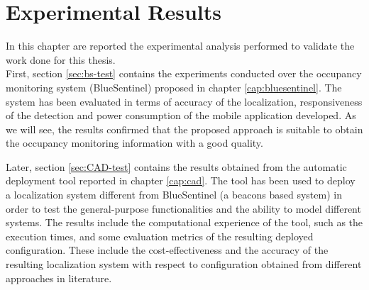 %
%
\chapter{Experimental Results}
%
\label{cap:results}

In this chapter are reported the experimental analysis performed to validate the work done for this thesis.\\
First, section \ref{sec:bs-test} contains the experiments conducted over the occupancy monitoring system (BlueSentinel) proposed in chapter \ref{cap:bluesentinel}. The system has been evaluated in terms of accuracy of the localization, responsiveness of the detection and power consumption of the mobile application developed. As we will see, the results confirmed that the proposed approach is suitable to obtain the occupancy monitoring information with a good quality.

Later, section \ref{sec:CAD-test} contains the results obtained from the automatic deployment tool reported in chapter \ref{cap:cad}. The tool has been used to deploy a localization system different from BlueSentinel (a beacons based system) in order to test the general-purpose functionalities and the ability to model different systems. The results include the computational experience of the tool, such as the execution times, and some evaluation metrics of the resulting deployed configuration. These include the cost-effectiveness and the accuracy of the resulting localization system with respect to configuration obtained from different approaches in literature.

